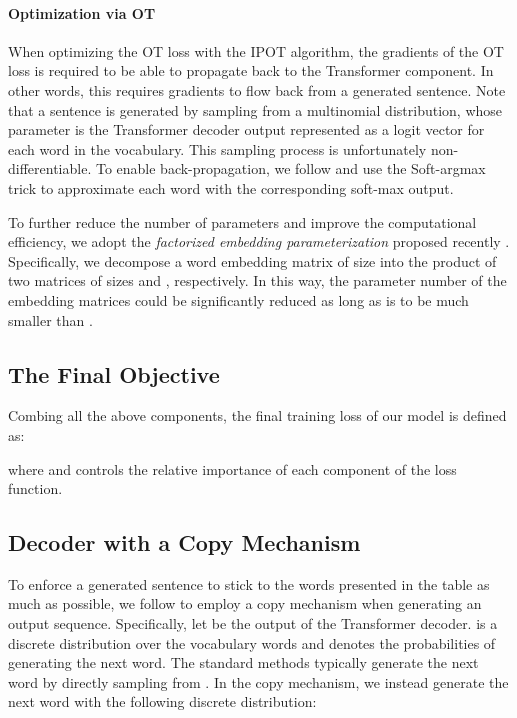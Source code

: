 \documentclass[11pt,a4paper]{article}
\begin{document}
\paragraph{Optimization via OT}
When optimizing the OT loss with the IPOT algorithm, the gradients of the OT loss is required to be able to propagate back to the Transformer component. In other words, this requires gradients to flow back from a generated sentence. Note that a sentence is generated by sampling from a multinomial distribution, whose parameter is the Transformer decoder output represented as a logit vector  for each word in the vocabulary. This sampling process is unfortunately non-differentiable. To enable back-propagation, we follow \citet{liqun2019} and use the Soft-argmax trick to approximate each word with the corresponding soft-max output.

To further reduce the number of parameters and improve the computational efficiency, we adopt the {\em factorized embedding parameterization} proposed recently \cite{ALBERT2019}. Specifically, we decompose a word embedding matrix of size  into the product of two matrices of sizes  and , respectively. In this way, the parameter number of the embedding matrices could be significantly reduced as long as  is to be much smaller than .

\subsection{The Final Objective}

Combing all the above components, the final training loss of our model is defined as:
\vspace{-0.2cm}
\par\vspace{-0.2cm}
\noindent where  and  controls the relative importance of each component of the loss function. 

\subsection {Decoder with a Copy Mechanism}
To enforce a generated sentence to stick to the words presented in the table as much as possible, we follow
\cite{see2017} to employ a copy mechanism when generating an output sequence. Specifically, let  be the output of the Transformer decoder.  is a discrete distribution over the vocabulary words and denotes the probabilities of generating the next word. The standard methods typically generate the next word by directly sampling from . In the copy mechanism, we instead generate the next word  with the following discrete distribution:
\end{document}
